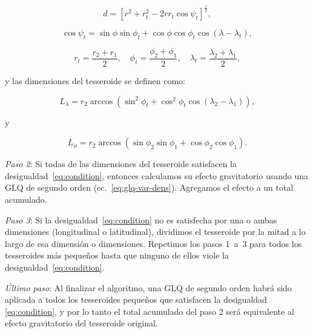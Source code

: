 \begin{equation}
    d = \left[
        r^2 + r_t^2 - 2 r r_t \cos\psi_t
        \right]^{\frac{1}{2}} ,
    \label{eq:distance}
\end{equation}

\begin{equation}
    \cos\psi_t =
        \sin\phi\sin\phi_t + \cos\phi\cos\phi_t\cos(\lambda - \lambda_t),
\end{equation}

\begin{equation}
    r_t = \frac{r_2 + r_1}{2}, \quad
    \phi_t = \frac{\phi_2 + \phi_1}{2}, \quad
    \lambda_t = \frac{\lambda_2 + \lambda_1}{2},
\end{equation}

\noindent
y las dimensiones del tesseroide se definen como:

\begin{equation}
    L_\lambda = r_2 \arccos(\sin^2\phi_t +
        \cos^2\phi_t\cos(\lambda_2 - \lambda_1)),
    \label{eq:sizelon}
\end{equation}

\noindent y

\begin{equation}
    L_\phi = r_2 \arccos(\sin\phi_2\sin\phi_1 + \cos\phi_2\cos\phi_1).
\end{equation}

\textit{Paso 2}:
Si todas de las dimensiones del tesseroide satisfacen la
desigualdad~\ref{eq:condition}, entonces calculamos su efecto gravitatorio
usando una \ac{GLQ} de segundo orden (ec.~\ref{eq:glq-var-dens}).
Agregamos el efecto a un total acumulado.

\textit{Paso 3}:
Si la desigualdad~\ref{eq:condition} no es satisfecha por una o ambas
dimensiones (longitudinal o latitudinal), dividimos el tesseroide por la mitad
a lo largo de esa dimensión o dimensiones.
Repetimos los pasos 1~a~3 para todos los tesseroides más pequeños hasta que
ninguno de ellos viole la desigualdad~\ref{eq:condition}.

\textit{Último paso}:
Al finalizar el algoritmo, una \ac{GLQ} de segundo orden habrá sido aplicada
a todos los tesseroides pequeños que satisfacen la desigualdad
\ref{eq:condition}, y por lo tanto el total acumulado del paso 2 será
equivalente al efecto gravitatorio del tesseroide original.

